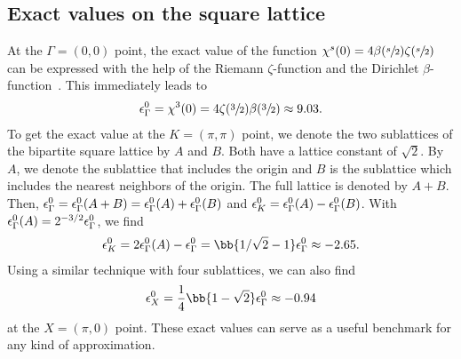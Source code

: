 \subsection{Exact values on the square lattice}
At the $\Gamma = (0, 0)$ point, the exact value of the function
$\chi^s(0) = 4\beta(\sfrac{s}{2})\zeta(\sfrac{s}{2})$
can be expressed with the help of the Riemann $\zeta$-function and the Dirichlet $\beta$-function~\cite{Glasser1973}.
This immediately leads to
\begin{align}
    \epsilon^0_\Gamma = \chi^3(0) = 4 \zeta(\sfrac{3}{2}) \beta(\sfrac{3}{2})\approx 9.03.
\end{align}
To get the exact value at the $K=(\pi,\pi)$ point, we denote the two sublattices of the bipartite square lattice by $A$ and $B$. Both have a lattice constant of $\sqrt{2}$.
By $A$, we denote the sublattice that includes the origin and $B$ is the sublattice which includes the nearest neighbors of the origin. The full lattice is denoted by $A+B$.
Then, $\epsilon^0_\Gamma = \epsilon^0_\Gamma(A+B) = \epsilon^0_\Gamma(A) + \epsilon^0_\Gamma(B)$
and
$\epsilon^0_K = \epsilon^0_\Gamma(A) - \epsilon^0_\Gamma(B)$. With $\epsilon^0_\Gamma(A)=2^{-3/2} \epsilon^0_\Gamma$, we find
\begin{align}
    \eps^0_K = 2\eps^0_\Gamma(A) - \eps^0_\Gamma = \bb{ 1/\sqrt{2} - 1 } \eps^0_\Gamma \approx -2.65.
\end{align}
Using a similar technique with four sublattices, we can also find
\begin{align}
    \eps^0_X = \frac{1}{4}\bb{ 1- \sqrt{2} } \eps^0_\Gamma \approx -0.94
\end{align}
at the $X=(\pi, 0)$ point. These exact values can serve as a useful benchmark for any kind of approximation.

